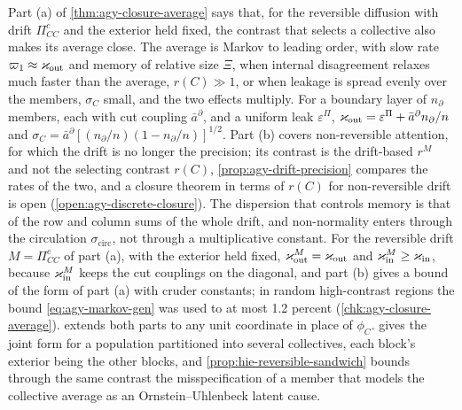 Part (a) of \cref{thm:agy-closure-average} says that, for the reversible diffusion with drift $\Pi^c_{CC}$ and the exterior held fixed, the contrast that selects a collective also makes its average close. The average is Markov to leading order, with slow rate $\varpi_1\approx\varkappa_{\mathrm{out}}$ and memory of relative size $\Xi$, when internal disagreement relaxes much faster than the average, $r(C)\gg1$, or when leakage is spread evenly over the members, $\sigma_C$ small, and the two effects multiply. For a boundary layer of $n_\partial$ members, each with cut coupling $\bar a^\partial$, and a uniform leak $\varepsilon^\Pi$, $\varkappa_{\mathrm{out}}=\varepsilon^\Pi+\bar a^\partial n_\partial/n$ and $\sigma_C=\bar a^\partial[(n_\partial/n)(1-n_\partial/n)]^{1/2}$. Part (b) covers non-reversible attention, for which the drift is no longer the precision; its contrast is the drift-based $r^M$ and not the selecting contrast $r(C)$, \cref{prop:agy-drift-precision} compares the rates of the two, and a closure theorem in terms of $r(C)$ for non-reversible drift is open (\cref{open:agy-discrete-closure}). The dispersion that controls memory is that of the row and column sums of the whole drift, and non-normality enters through the circulation $\sigma_{\mathrm{circ}}$, not through a multiplicative constant. For the reversible drift $M=\Pi^c_{CC}$ of part (a), with the exterior held fixed, $\varkappa_{\mathrm{out}}^M=\varkappa_{\mathrm{out}}$ and $\varkappa_{\mathrm{in}}^M\ge\varkappa_{\mathrm{in}}$, because $\varkappa_{\mathrm{in}}^M$ keeps the cut couplings on the diagonal, and part (b) gives a bound of the form of part (a) with cruder constants; in random high-contrast regions the bound \eqref{eq:agy-markov-gen} was used to at most 1.2 percent (\cref{chk:agy-closure-average}).  extends both parts to any unit coordinate in place of $\phi_C$.  gives the joint form for a population partitioned into several collectives, each block's exterior being the other blocks, and \cref{prop:hie-reversible-sandwich} bounds through the same contrast the misspecification of a member that models the collective average as an Ornstein--Uhlenbeck latent cause.


